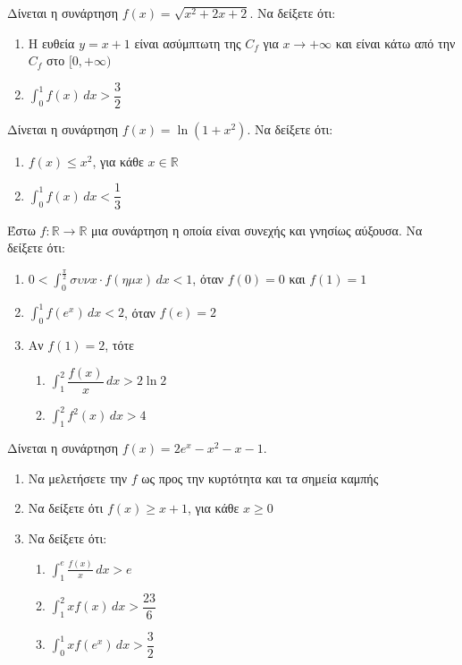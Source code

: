 \documentclass{../presentation}
\begin{document}
\begin{askisi}
  Δίνεται η συνάρτηση $f(x)=\sqrt{x^2+2x+2}$. Να δείξετε ότι:
  \begin{enumerate}[<+->]
    \item Η ευθεία $y=x+1$ είναι ασύμπτωτη της $C_f$ για $x\to +\infty$ και είναι κάτω από την $C_f$ στο $[0,+\infty)$
    \item $\int_{0}^{1}f(x)\, dx>\dfrac{3}{2}$
  \end{enumerate}
\end{askisi}

\begin{askisi}
  Δίνεται η συνάρτηση $f(x)=\ln (1+x^2)$. Να δείξετε ότι:
  \begin{enumerate}[<+->]
    \item $f(x)\le x^2$, για κάθε $x\in \mathbb{R}$
    \item $\int_{0}^{1}f(x)\, dx<\dfrac{1}{3}$
  \end{enumerate}
\end{askisi}

\begin{askisi}
  Έστω $f:\mathbb{R}\to \mathbb{R}$ μια συνάρτηση η οποία είναι συνεχής και γνησίως αύξουσα. Να δείξετε ότι:
  \begin{enumerate}[<+->]
    \item $0<\int_{0}^{\frac{\pi}{2}}συνx\cdot f(ημx)\, dx<1$, όταν $f(0)=0$ και $f(1)=1$
    \item $\int_{0}^{1}f(e^x)\, dx<2$, όταν $f(e)=2$
    \item Αν $f(1)=2$, τότε
          \begin{enumerate}[<+->]
            \item $\int_{1}^{2}\dfrac{f(x)}{x}\, dx>2\ln 2$
            \item $\int_{1}^{2}f^2(x)\, dx>4$
          \end{enumerate}
  \end{enumerate}
\end{askisi}

\begin{askisi}
  Δίνεται η συνάρτηση $f(x)=2e^x-x^2-x-1$.
  \begin{enumerate}[<+->]
    \item Να μελετήσετε την $f$ ως προς την κυρτότητα και τα σημεία καμπής
    \item Να δείξετε ότι $f(x)\ge x+1$, για κάθε $x\ge 0$
    \item Να δείξετε ότι:
          \begin{enumerate}[<+->]
            \item $\int_{1}^{e}\frac{f(x)}{x}\, dx>e$
            \item $\int_{1}^{2}xf(x)\, dx>\dfrac{23}{6}$
            \item $\int_{0}^{1}xf(e^x)\, dx>\dfrac{3}{2}$
          \end{enumerate}
  \end{enumerate}
\end{askisi}
\end{document}

